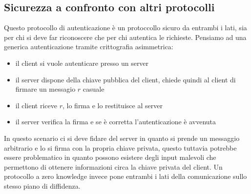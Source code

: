 \subsection{Sicurezza a confronto con altri protocolli}
Questo protocollo di autenticazione è un protoccollo sicuro da entrambi i lati, sia per chi si deve far riconoscere che per chi autentica le richieste. Pensiamo ad una generica autenticazione tramite crittografia asimmetrica:
\begin{itemize}
    \item il client si vuole autenticare presso un server
    \item il server dispone della chiave pubblica del client, chiede quindi al client di firmare un messagio $r$ casuale
    \item il client riceve $r$, lo firma e lo restituisce al server
    \item il server verifica la firma e se è corretta l'autenticazione è avvenuta
\end{itemize}
In questo scenario ci si deve fidare del server in quanto si prende un messaggio arbitrario e lo si firma con la propria chiave privata, questo tuttavia potrebbe essere problematico in quanto possono esistere degli input malevoli che permettono di ottenere informazioni circa la chiave privata del client. Un protocollo a zero knowledge invece pone entrambi i lati della comunicazione sullo stesso piano di diffidenza.

\clearpage